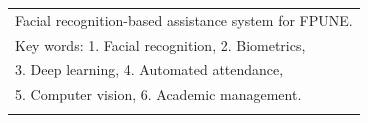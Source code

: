 \begin{center}
\begin{tabular}{|l|}
Facial recognition-based assistance system for FPUNE. \\
Key words:  1. Facial recognition, 2. Biometrics, 
\\ \hspace{2cm} 3. Deep learning, 4. Automated attendance, 
\\ \hspace{2cm} 5. Computer vision, 6. Academic management. \\
\\
\hline
\end{tabular}
\end{center}

